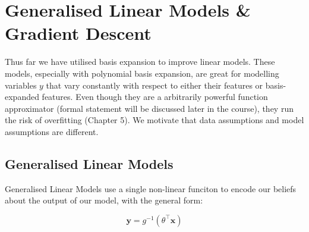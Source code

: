 \chapter{Generalised Linear Models \& Gradient Descent}


Thus far we have utilised basis expansion to improve linear models. These models, especially with polynomial basis expansion, are great for modelling variables $y$ that vary constantly with respect to either their features or basis-expanded features.  Even though they are a arbitrarily powerful function approximator (formal statement will be discussed later in the course), they run the risk of overfitting (Chapter 5).  We motivate that data assumptions and model assumptions are different.


\section{Generalised Linear Models}
Generalised Linear Models use a single non-linear funciton to encode our beliefs about the output of our model, with the general form:

\begin{equation}
    \bm{y} = g^{-1}(\theta ^\top \bm{x})
\end{equation}

